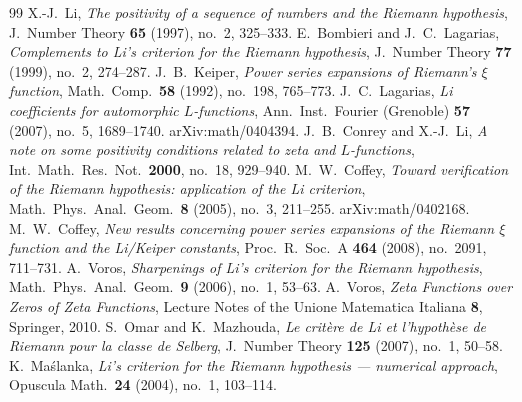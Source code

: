 \documentclass[11pt]{amsart}
\theoremstyle{definition}
\theoremstyle{remark}
\theoremstyle{definition}
\begin{document}
\begin{thebibliography}{99}
 X.-J.~Li, \emph{The positivity of a sequence of numbers and the Riemann
hypothesis}, J.\ Number Theory \textbf{65} (1997), no.~2, 325--333.
 E.~Bombieri and J.~C.~Lagarias, \emph{Complements to Li's criterion
for the Riemann hypothesis}, J.\ Number Theory \textbf{77} (1999), no.~2, 274--287.
 J.~B.~Keiper, \emph{Power series expansions of Riemann's $\xi$ function},
Math.\ Comp.\ \textbf{58} (1992), no.~198, 765--773.
 J.~C.~Lagarias, \emph{Li coefficients for automorphic $L$-functions}, Ann.\
Inst.\ Fourier (Grenoble) \textbf{57} (2007), no.~5, 1689--1740. arXiv:math/0404394.
\bibitem{ConreyLi} J.~B.~Conrey and X.-J.~Li, \emph{A note on some positivity conditions related to
zeta and $L$-functions}, Int.\ Math.\ Res.\ Not.\ \textbf{2000}, no.~18, 929--940.
\bibitem{Coffey2005} M.~W.~Coffey, \emph{Toward verification of the Riemann hypothesis: application
of the Li criterion}, Math.\ Phys.\ Anal.\ Geom.\ \textbf{8} (2005), no.~3, 211--255.
arXiv:math/0402168.
 M.~W.~Coffey, \emph{New results concerning power series expansions of the
Riemann $\xi$ function and the Li/Keiper constants}, Proc.\ R.\ Soc.\ A \textbf{464} (2008),
no.~2091, 711--731.
 A.~Voros, \emph{Sharpenings of Li's criterion for the Riemann hypothesis},
Math.\ Phys.\ Anal.\ Geom.\ \textbf{9} (2006), no.~1, 53--63.
 A.~Voros, \emph{Zeta Functions over Zeros of Zeta Functions}, Lecture Notes of
the Unione Matematica Italiana \textbf{8}, Springer, 2010.
 S.~Omar and K.~Mazhouda, \emph{Le crit\`ere de Li et l'hypoth\`ese de
Riemann pour la classe de Selberg}, J.\ Number Theory \textbf{125} (2007), no.~1, 50--58.
\bibitem{Maslanka} K.~Ma\'slanka, \emph{Li's criterion for the Riemann hypothesis --- numerical
approach}, Opuscula Math.\ \textbf{24} (2004), no.~1, 103--114.


\end{thebibliography}
\end{document}
